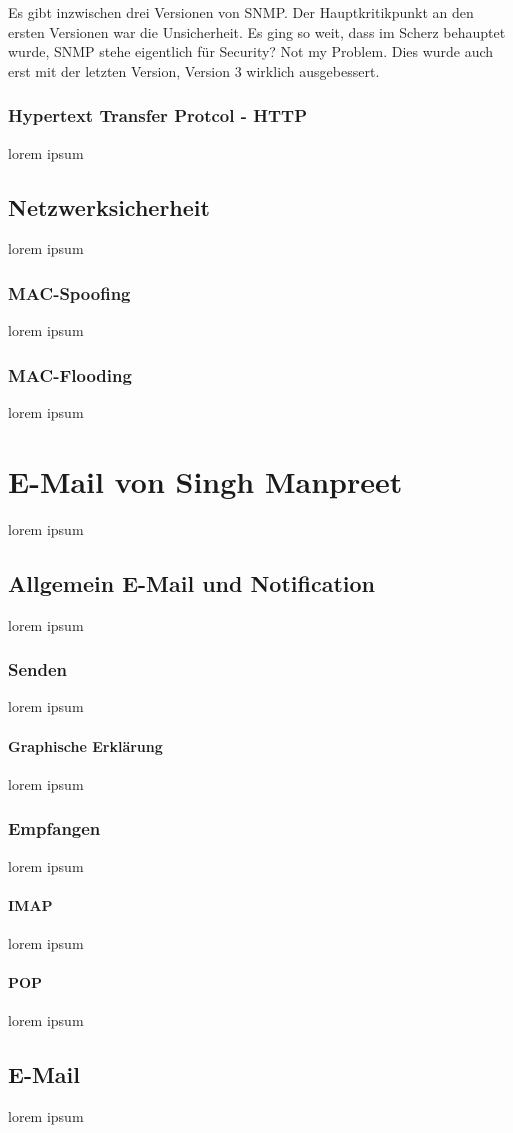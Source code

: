 \documentclass[11pt,a4paper]{report}
\begin{document}
Es gibt inzwischen drei Versionen von SNMP. Der Hauptkritikpunkt an den ersten Versionen war die Unsicherheit. Es ging so weit, dass im Scherz behauptet wurde, SNMP stehe eigentlich für Security? Not my Problem. Dies wurde auch erst mit der letzten Version, Version 3 wirklich ausgebessert. 
\subsection{Hypertext Transfer Protcol - HTTP}
lorem ipsum
\section{Netzwerksicherheit}
lorem ipsum
\subsection{MAC-Spoofing}\label{ssec:mspoof}
lorem ipsum
\subsection{MAC-Flooding}\label{ssec:mflood}
lorem ipsum

\chapter{E-Mail von Singh Manpreet}
lorem ipsum
\section{Allgemein E-Mail und Notification}
lorem ipsum
\subsection{Senden}
lorem ipsum
\subsubsection{Graphische Erklärung}
lorem ipsum
\subsection{Empfangen}
lorem ipsum
\subsubsection{IMAP}
lorem ipsum
\subsubsection{POP}
lorem ipsum
\section{E-Mail}
lorem ipsum
\end{document}

